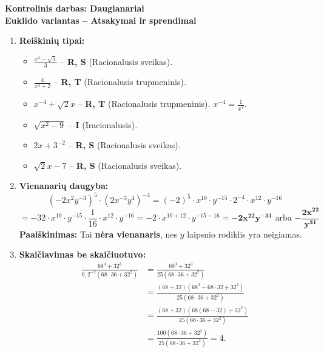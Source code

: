 \documentclass[12pt,a4paper]{article}
\begin{document}
\begin{center}
    {\Large \textbf{Kontrolinis darbas: Daugianariai}}\\[0.3cm]
    {\large \textbf{Euklido variantas -- Atsakymai ir sprendimai}}
\end{center}
\vspace{0.5cm}

\begin{enumerate}
    \item \textbf{Reiškinių tipai:}
    \begin{itemize}
        \item[a)] $\displaystyle \frac{x^4 - \sqrt{5}}{3}$ -- \textbf{R, S} (Racionalusis sveikas). 
        \item[b)] $\displaystyle \frac{4}{x^3 + 2}$ -- \textbf{R, T} (Racionalusis trupmeninis).
        \item[c)] $\displaystyle x^{-4} + \sqrt{2} x$ -- \textbf{R, T} (Racionalusis trupmeninis). $x^{-4} = \frac{1}{x^4}$.
        \item[d)] $\displaystyle \sqrt{x^2 - 9}$ -- \textbf{I} (Iracionalusis).
        \item[e)] $\displaystyle 2x + 3^{-2}$ -- \textbf{R, S} (Racionalusis sveikas). 
        \item[f)] $\displaystyle \sqrt{2}x - 7$ -- \textbf{R, S} (Racionalusis sveikas).
    \end{itemize}

    \vspace{0.3cm}
    \item \textbf{Vienanarių daugyba:} \\
    $$ \left( -2x^2y^{-3} \right)^5 \cdot \left( 2x^{-3}y^4 \right)^{-4} = (-2)^5 \cdot x^{10} \cdot y^{-15} \cdot 2^{-4} \cdot x^{12} \cdot y^{-16} $$
    $$ = -32 \cdot x^{10} \cdot y^{-15} \cdot \frac{1}{16} \cdot x^{12} \cdot y^{-16} = -2 \cdot x^{10+12} \cdot y^{-15-16} = \mathbf{-2x^{22}y^{-31}} \text{ arba } \mathbf{-\frac{2x^{22}}{y^{31}}} $$
    \textbf{Paaiškinimas:} Tai \textbf{nėra vienanaris}, nes $y$ laipsnio rodiklis yra neigiamas.

    \vspace{0.3cm}
    \item \textbf{Skaičiavimas be skaičiuotuvo:} \\
    \begin{align*}
        \frac{68^3+32^3}
        {0,2^{-2}\left(68\cdot36+32^2\right)}
        &= \frac{68^3+32^3}
        {25\left(68\cdot36+32^2\right)} \\
        &= \frac{(68+32)\left(68^2-68\cdot32+32^2\right)}
        {25\left(68\cdot36+32^2\right)} \\
        &= \frac{(68+32)\left(68(68-32)+32^2\right)}
        {25\left(68\cdot36+32^2\right)} \\
        &= \frac{100\left(68\cdot36+32^2\right)}
        {25\left(68\cdot36+32^2\right)} = 4.
    \end{align*}


\end{enumerate}
\end{document}
